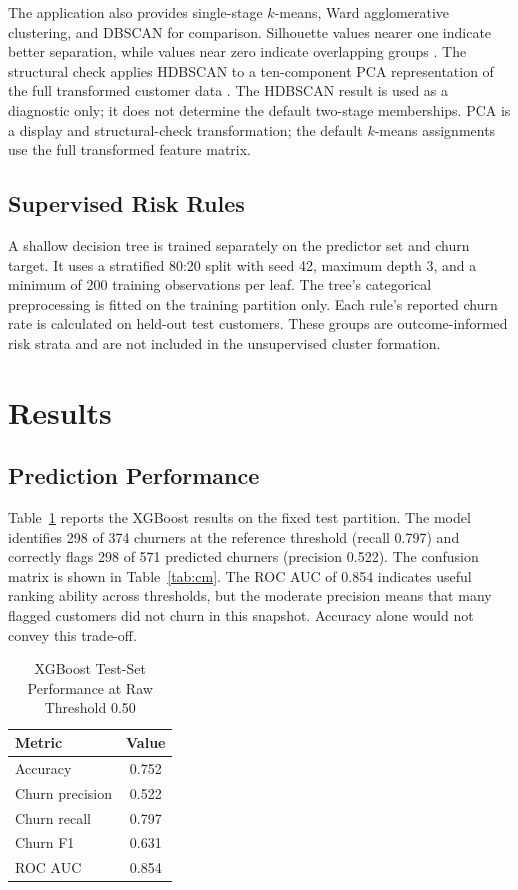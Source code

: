 \documentclass[conference]{IEEEtran}
\begin{document}
The application also provides single-stage $k$-means, Ward agglomerative clustering, and DBSCAN for comparison. Silhouette values nearer one indicate better separation, while values near zero indicate overlapping groups \cite{rousseeuw1987silhouettes}. The structural check applies HDBSCAN to a ten-component PCA representation of the full transformed customer data \cite{campello2013hdbscan}. The HDBSCAN result is used as a diagnostic only; it does not determine the default two-stage memberships. PCA is a display and structural-check transformation; the default $k$-means assignments use the full transformed feature matrix.

\subsection{Supervised Risk Rules}
A shallow decision tree is trained separately on the predictor set and churn target. It uses a stratified 80:20 split with seed 42, maximum depth 3, and a minimum of 200 training observations per leaf. The tree's categorical preprocessing is fitted on the training partition only. Each rule's reported churn rate is calculated on held-out test customers. These groups are outcome-informed risk strata and are not included in the unsupervised cluster formation.

\section{Results}
\subsection{Prediction Performance}
Table~\ref{tab:performance} reports the XGBoost results on the fixed test partition. The model identifies 298 of 374 churners at the reference threshold (recall 0.797) and correctly flags 298 of 571 predicted churners (precision 0.522). The confusion matrix is shown in Table~\ref{tab:cm}. The ROC AUC of 0.854 indicates useful ranking ability across thresholds, but the moderate precision means that many flagged customers did not churn in this snapshot. Accuracy alone would not convey this trade-off.

\begin{table}[!t]
\centering
\caption{XGBoost Test-Set Performance at Raw Threshold 0.50}
\label{tab:performance}
\begin{tabular}{lc}
\toprule
Metric & Value \\
\midrule
Accuracy & 0.752 \\
Churn precision & 0.522 \\
Churn recall & 0.797 \\
Churn F1 & 0.631 \\
ROC AUC & 0.854 \\
\bottomrule
\end{tabular}
\end{table}
\end{document}
